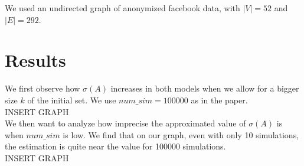 \documentclass[paper=a4,fontsize=11pt,DIV=8,BCOR=5mm,twoside,pdftex]{scrartcl}
\begin{document}
We used an undirected graph of anonymized facebook data, with $|V| = 52$ and $|E| =292 $.

\section{Results}	
	
We first observe how $\sigma(A)$ increases in both models when we allow for a bigger size $k$ of the initial set. We use $num\_sim = 100000 $ as in the paper.\\

INSERT GRAPH\\

We then want to analyze how imprecise the approximated value of $\sigma(A)$ is when $num\_sim$ is low. We find that on our graph, even with only 10 simulations, the estimation is quite near the value for 100000 simulations.\\

INSERT GRAPH\\
\end{document}
